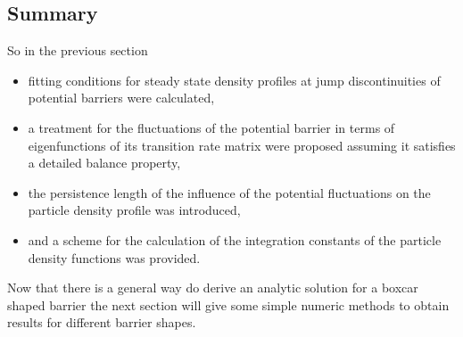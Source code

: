 \subsection{Summary}
        So in the previous section 
\begin{itemize}
    \item fitting conditions for steady state density profiles at jump discontinuities of potential barriers were calculated,
    \item a treatment for the fluctuations of the potential barrier in terms of eigenfunctions of its transition rate matrix were proposed assuming it satisfies a detailed balance property,
    \item  the persistence length of the influence of the potential fluctuations on the particle density profile was introduced,
    \item and a scheme for the calculation of the integration constants of the particle density functions was provided.
\end{itemize}
Now that there is a general way do derive an analytic solution for a boxcar shaped barrier the next section will give some simple numeric methods to obtain results for different barrier shapes.
\newpage

